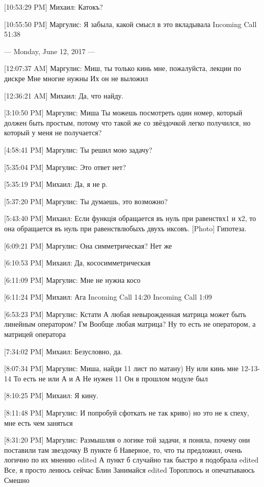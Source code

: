\documentclass{article}
\newcommand{\yat}{{\fontencoding{X2}\selectfont\cyryat}} %
\begin{document}
[10:53:29 PM] Михаил:
Катокъ?

[10:55:50 PM] Маргулис:
Я забыла, какой смысл в это вкладывала
Incoming Call 51:38

--- Monday, June 12, 2017 ---

[12:07:37 AM] Маргулис:
Миш, ты только кинь мне, пожалуйста, лекции по дискре
 Мне многие нужны
 Их он не выложил

[12:36:21 AM] Михаил:
Да, что найду.

[3:10:50 PM] Маргулис:
Миша
 Ты можешь посмотреть один номер, который должен быть простым, потому что такой же со звёздочкой легко получился, но который у меня не получается?

[4:58:41 PM] Маргулис:
Ты решил мою задачу?

[5:35:04 PM] Маргулис:
Это ответ нет?

[5:35:19 PM] Михаил:
Да, я не р.

[5:37:20 PM] Маргулис:
Ты думаешь, это возможно?

[5:43:40 PM] Михаил:
Если функція обращается въ нуль при равенств\yat х1 и х2, то она обращается въ нуль при равенств\yat любыхъ двухъ иксовъ.
 [Photo]
 Гипотеза.

[6:09:21 PM] Маргулис:
Она симметрическая?
 Нет же

[6:10:53 PM] Михаил:
Да, кососимметрическая

[6:11:09 PM] Маргулис:
Мне не нужна косо

[6:11:24 PM] Михаил:
Ага
Incoming Call 14:20
Incoming Call 1:09

[6:53:23 PM] Маргулис:
Кстати
 А любая невырожденная матрица может быть линейным оператором?
 Гм
 Вообще любая матрица?
 Ну то есть не оператором, а матрицей оператора

[7:34:02 PM] Михаил:
Безусловно, да.

[8:07:34 PM] Маргулис:
Миша, найди 11 лист по матану)
 Ну или кинь мне 12-13-14
 То есть не или
 А и
 А
 Не нужен 11
 Он в прошлом модуле был

[8:10:25 PM] Михаил:
Я кину.

[8:11:48 PM] Маргулис:
И попробуй сфоткать не так криво) но это не к спеху, мне есть чем заняться

[8:31:20 PM] Маргулис:
Размышляя о логике той задачи, я поняла, почему они поставили там звездочку
 В пункте б
 Наверное, то, что ты предложил, очень логично по их мнению
edited 
А пункт б случайно так быстро я подобрала
edited 
Все, я просто ленюсь сейчас
 Блин
 Занимайся
edited 
Тороплюсь и опечатываюсь
 Смешно
\end{document}
